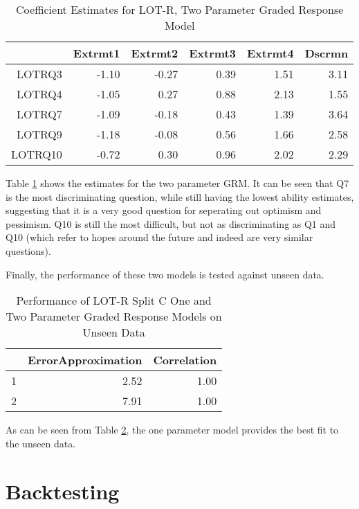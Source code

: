 \documentclass{article}
\begin{document}
\begin{table}[ht]
\centering
\begin{tabular}{rrrrrr}
  \hline
 & Extrmt1 & Extrmt2 & Extrmt3 & Extrmt4 & Dscrmn \\ 
  \hline
LOTRQ3 & -1.10 & -0.27 & 0.39 & 1.51 & 3.11 \\ 
  LOTRQ4 & -1.05 & 0.27 & 0.88 & 2.13 & 1.55 \\ 
  LOTRQ7 & -1.09 & -0.18 & 0.43 & 1.39 & 3.64 \\ 
  LOTRQ9 & -1.18 & -0.08 & 0.56 & 1.66 & 2.58 \\ 
  LOTRQ10 & -0.72 & 0.30 & 0.96 & 2.02 & 2.29 \\ 
   \hline
\end{tabular}
\caption{Coefficient Estimates for LOT-R, Two Parameter Graded Response Model} 
\label{tab:lotr2cgrm2pl}
\end{table}
Table \ref{tab:lotr2cgrm2pl} shows the estimates for the two parameter GRM. It can be seen that Q7 is  the most discriminating question, while still having the lowest ability estimates, suggesting that it is a very good question for seperating out optimism and pessimism. Q10 is still the most difficult, but not as discriminating as Q1 and Q10 (which refer to hopes around the future and indeed are very similar questions). 

Finally, the performance of these two models is tested against unseen data. 


\begin{table}[ht]
\centering
\begin{tabular}{rrr}
  \hline
 & ErrorApproximation & Correlation \\ 
  \hline
1 & 2.52 & 1.00 \\ 
  2 & 7.91 & 1.00 \\ 
   \hline
\end{tabular}
\caption{Performance of LOT-R Split C One and Two Parameter Graded Response Models on Unseen Data} 
\label{tab:lotr2cgrmtest}
\end{table}
As can be seen from Table \ref{tab:lotr2cgrmtest}, the one parameter model provides the best fit to the unseen data. 




\section{Backtesting}
\label{sec:backtesting}
\end{document}
